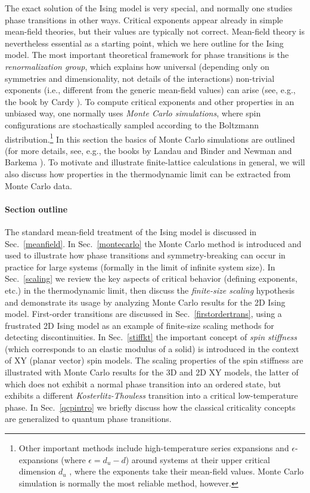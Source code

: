 \documentclass[draft,numberedheadings]{aipproc}
\begin{document}
The exact solution of the Ising model is very special, and normally one studies phase transitions in other ways. Critical exponents appear already in 
simple mean-field theories, but their values are typically not correct. Mean-field theory is nevertheless essential as a starting point, which we here
outline for the Ising model. The most important theoretical framework for phase transitions is the {\it renormalization group}, which explains how 
universal (depending only on symmetries and dimensionality, not details of the interactions) non-trivial exponents (i.e., different from the generic 
mean-field values) can arise (see, e.g., the book by Cardy \cite{cardy}). To compute critical exponents and other properties in an unbiased way, one 
normally uses {\it Monte Carlo simulations}, where spin configurations are stochastically sampled according to the Boltzmann distribution.\footnote{Other 
important methods include high-temperature series expansions \cite{series} and $\epsilon$-expansions (where $\epsilon=d_u-d$) around systems at their upper 
critical dimension $d_u$ \cite{epsilon}, where the exponents take their mean-field values. Monte Carlo simulation is normally the most reliable method, 
however.} In this section the basics of Monte Carlo simulations are outlined (for more details, see, e.g., the books by Landau and Binder \cite{binderlandau} 
and Newman and Barkema \cite{newman}). To motivate and illustrate finite-lattice calculations in general, we will also discuss how properties in 
the thermodynamic limit can be extracted from Monte Carlo data. 

\paragraph{Section outline}

The standard mean-field treatment of the Ising model is discussed in Sec.~\ref{meanfield}. In Sec.~\ref{montecarlo} the Monte Carlo method is
introduced and used to illustrate how phase transitions and symmetry-breaking can occur in practice for large systems (formally in the limit of infinite system size). 
In Sec.~\ref{scaling} we review the key 
aspects of critical behavior (defining exponents, etc.) in the thermodynamic limit, then discuss the {\it finite-size scaling} hypothesis and demonstrate 
its usage by analyzing Monte Carlo results for the 2D Ising model. First-order transitions are discussed in Sec.~\ref{firstordertrans}, using a frustrated 
2D Ising model as an example of finite-size scaling methods for detecting discontinuities. In Sec.~\ref{stiffkt} the important concept of {\it spin 
stiffness} (which corresponds to an elastic modulus of a solid) is introduced in the context of XY (planar vector) spin models. The scaling properties 
of the spin stiffness are illustrated with Monte Carlo results for the 3D and 2D XY models, the latter of which does not exhibit a normal phase transition 
into an ordered state, but exhibits a different {\it Kosterlitz-Thouless} transition into a critical low-temperature phase. In Sec.~\ref{qcpintro} 
we briefly discuss how the classical criticality concepts are generalized to quantum phase transitions.
\end{document}
